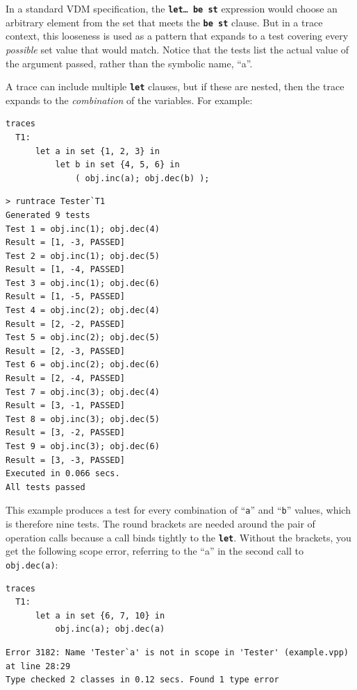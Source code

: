 \documentclass{overturerepchap}
\begin{document}
\noindent In a standard VDM specification, the \texttt{\textbf{let}\ldots\
\textbf{be st}} expression would choose an arbitrary element from the set that
meets the \texttt{\textbf{be st}} clause. But in a trace context, this
looseness is used as a pattern that expands to a test covering every
\emph{possible} set value that would match. Notice that the tests list the
actual value of the argument passed, rather than the symbolic name, ``a''.

A trace can include multiple \texttt{\textbf{let}} clauses, but if these are nested, then
the trace expands to the \emph{combination} of the variables. For example:

\small
\begin{lstlisting}
traces
  T1:
      let a in set {1, 2, 3} in
          let b in set {4, 5, 6} in
              ( obj.inc(a); obj.dec(b) );
\end{lstlisting}

\lstset{style=tool,language=}
\begin{lstlisting}[escapechar=@]
> runtrace Tester`T1
Generated 9 tests
Test 1 = obj.inc(1); obj.dec(4)
Result = [1, -3, PASSED]
Test 2 = obj.inc(1); obj.dec(5)
Result = [1, -4, PASSED]
Test 3 = obj.inc(1); obj.dec(6)
Result = [1, -5, PASSED]
Test 4 = obj.inc(2); obj.dec(4)
Result = [2, -2, PASSED]
Test 5 = obj.inc(2); obj.dec(5)
Result = [2, -3, PASSED]
Test 6 = obj.inc(2); obj.dec(6)
Result = [2, -4, PASSED]
Test 7 = obj.inc(3); obj.dec(4)
Result = [3, -1, PASSED]
Test 8 = obj.inc(3); obj.dec(5)
Result = [3, -2, PASSED]
Test 9 = obj.inc(3); obj.dec(6)
Result = [3, -3, PASSED]
Executed in 0.066 secs. 
All tests passed
\end{lstlisting}
\lstset{style=mystyle}
\lstset{language=VDM++}
\normalsize

\noindent This example produces a test for every combination of ``\texttt{a}''
and ``\texttt{b}'' values, which is therefore nine tests. The round brackets
are needed around the pair of operation calls because a call binds tightly to
the \texttt{\textbf{let}}. Without the brackets, you get the following scope
error, referring to the ``a'' in the second call to \texttt{obj.dec(a)}:

\small
\begin{lstlisting}
traces
  T1:
      let a in set {6, 7, 10} in
          obj.inc(a); obj.dec(a)
\end{lstlisting}
\scriptsize
\lstset{style=tool,language=}
\begin{lstlisting}[escapechar=@]
Error 3182: Name 'Tester`a' is not in scope in 'Tester' (example.vpp) at line 28:29
Type checked 2 classes in 0.12 secs. Found 1 type error
\end{lstlisting}
\lstset{style=mystyle}
\lstset{language=VDM++}
\normalsize
\end{document}
